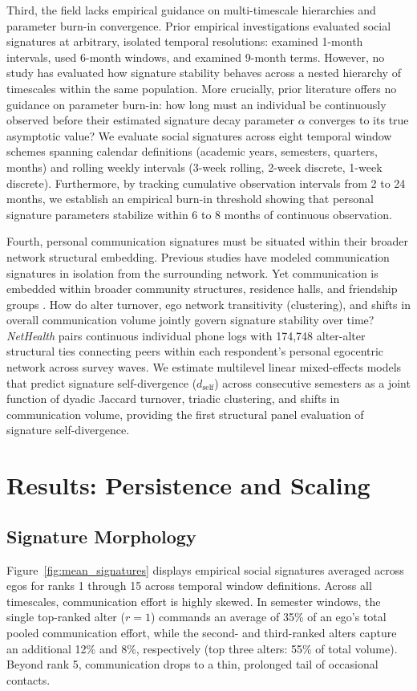 \documentclass[11pt,letterpaper]{article}
\newcommand{\dself}{d_{\mathrm{self}}}
\begin{document}
Third, the field lacks empirical guidance on multi-timescale hierarchies and parameter burn-in convergence. Prior empirical investigations evaluated social signatures at arbitrary, isolated temporal resolutions: \citet{li2022evidence} examined 1-month intervals, \citet{heydari2018multichannel} used 6-month windows, and \citet{saramaeki2014persistence} examined 9-month terms. However, no study has evaluated how signature stability behaves across a nested hierarchy of timescales within the same population. More crucially, prior literature offers no guidance on parameter burn-in: how long must an individual be continuously observed before their estimated signature decay parameter $\alpha$ converges to its true asymptotic value? We evaluate social signatures across eight temporal window schemes spanning calendar definitions (academic years, semesters, quarters, months) and rolling weekly intervals (3-week rolling, 2-week discrete, 1-week discrete). Furthermore, by tracking cumulative observation intervals from 2 to 24 months, we establish an empirical burn-in threshold showing that personal signature parameters stabilize within 6 to 8 months of continuous observation.

Fourth, personal communication signatures must be situated within their broader network structural embedding. Previous studies have modeled communication signatures in isolation from the surrounding network. Yet communication is embedded within broader community structures, residence halls, and friendship groups \citep{li2018social}. How do alter turnover, ego network transitivity (clustering), and shifts in overall communication volume jointly govern signature stability over time? \textit{NetHealth} pairs continuous individual phone logs with 174,748 alter-alter structural ties connecting peers within each respondent's personal egocentric network across survey waves. We estimate multilevel linear mixed-effects models that predict signature self-divergence ($\dself$) across consecutive semesters as a joint function of dyadic Jaccard turnover, triadic clustering, and shifts in communication volume, providing the first structural panel evaluation of signature self-divergence.

\section{Results: Persistence and Scaling}

\subsection{Signature Morphology}
Figure~\ref{fig:mean_signatures} displays empirical social signatures averaged across egos for ranks 1 through 15 across temporal window definitions. Across all timescales, communication effort is highly skewed. In semester windows, the single top-ranked alter ($r = 1$) commands an average of 35\% of an ego's total pooled communication effort, while the second- and third-ranked alters capture an additional 12\% and 8\%, respectively (top three alters: 55\% of total volume). Beyond rank 5, communication drops to a thin, prolonged tail of occasional contacts.
\end{document}
